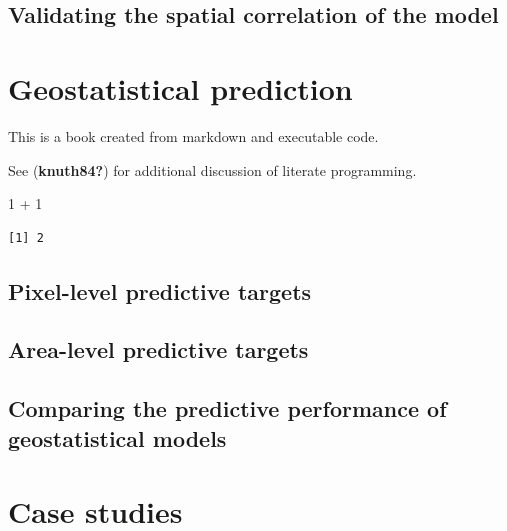 \documentclass[
  letterpaper,
]{krantz}
\newenvironment{Shaded}{\begin{snugshade}}{\end{snugshade}}
\newcommand{\DecValTok}[1]{\textcolor[rgb]{0.68,0.00,0.00}{#1}}
\newcommand{\SpecialCharTok}[1]{\textcolor[rgb]{0.37,0.37,0.37}{#1}}
\begin{document}
\hypertarget{validating-the-spatial-correlation-of-the-model}{%
\section{Validating the spatial correlation of the
model}\label{validating-the-spatial-correlation-of-the-model}}


\hypertarget{sec-geo-prediction}{%
\chapter{Geostatistical prediction}\label{sec-geo-prediction}}

This is a book created from markdown and executable code.

See (\textbf{knuth84?}) for additional discussion of literate
programming.

\begin{Shaded}
\begin{Highlighting}[]
\DecValTok{1} \SpecialCharTok{+} \DecValTok{1}
\end{Highlighting}
\end{Shaded}

\begin{verbatim}
[1] 2
\end{verbatim}

\hypertarget{pixel-level-predictive-targets}{%
\section{Pixel-level predictive
targets}\label{pixel-level-predictive-targets}}

\hypertarget{area-level-predictive-targets}{%
\section{Area-level predictive
targets}\label{area-level-predictive-targets}}

\hypertarget{comparing-the-predictive-performance-of-geostatistical-models}{%
\section{Comparing the predictive performance of geostatistical
models}\label{comparing-the-predictive-performance-of-geostatistical-models}}


\hypertarget{sec-case-studies}{%
\chapter{Case studies}\label{sec-case-studies}}
\end{document}
